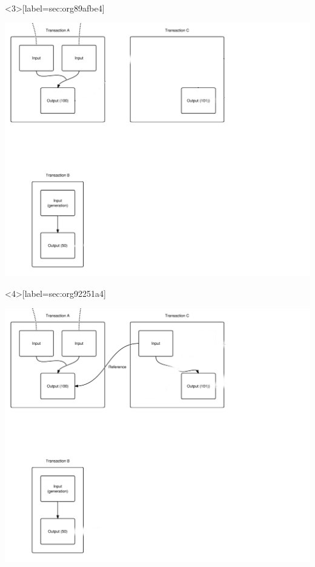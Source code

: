 \documentclass[presentation]{beamer}
\begin{document}
\begin{frame}<3>[label={sec:org89afbe4}]{}
\begin{center}
\includegraphics[width=.9\textwidth]{Images/Transaction3.png}
\end{center}
\end{frame}
\begin{frame}<4>[label={sec:org92251a4}]{}
\begin{center}
\includegraphics[width=.9\textwidth]{Images/Transaction4.png}
\end{center}
\end{frame}
\end{document}
